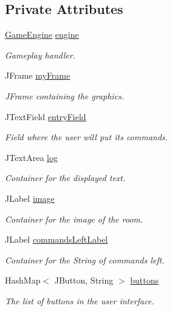 \subsection*{Private Attributes}
\begin{DoxyCompactItemize}
\item 
\hyperlink{classpkg__game_1_1GameEngine}{Game\-Engine} \hyperlink{classpkg__game_1_1UserInterface_aa212a563cd1a7c42210b8843429d7977}{engine}
\begin{DoxyCompactList}\small\item\em Gameplay handler. \end{DoxyCompactList}\item 
J\-Frame \hyperlink{classpkg__game_1_1UserInterface_a482eeb80a47dd8c4148af0ea648a8b49}{my\-Frame}
\begin{DoxyCompactList}\small\item\em J\-Frame containing the graphics. \end{DoxyCompactList}\item 
J\-Text\-Field \hyperlink{classpkg__game_1_1UserInterface_ae405fc2ad81ccf31aad56484a9c1c2bc}{entry\-Field}
\begin{DoxyCompactList}\small\item\em Field where the user will put its commands. \end{DoxyCompactList}\item 
J\-Text\-Area \hyperlink{classpkg__game_1_1UserInterface_adc5e92cdd16b74971a7f6ff74d96bffb}{log}
\begin{DoxyCompactList}\small\item\em Container for the displayed text. \end{DoxyCompactList}\item 
J\-Label \hyperlink{classpkg__game_1_1UserInterface_ac4146c151419321baacf6fb1769e7510}{image}
\begin{DoxyCompactList}\small\item\em Container for the image of the room. \end{DoxyCompactList}\item 
J\-Label \hyperlink{classpkg__game_1_1UserInterface_a8ffc0ac7b194efdbb234aafefe1297b9}{commands\-Left\-Label}
\begin{DoxyCompactList}\small\item\em Container for the String of commands left. \end{DoxyCompactList}\item 
Hash\-Map$<$ J\-Button, String $>$ \hyperlink{classpkg__game_1_1UserInterface_adf0313432ad0c09aae5dcb09cb34a7c2}{buttons}
\begin{DoxyCompactList}\small\item\em The list of buttons in the user interface. \end{DoxyCompactList}\end{DoxyCompactItemize}


